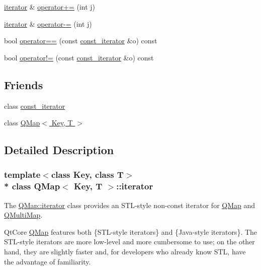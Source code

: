 \begin{DoxyCompactItemize}
\item 
\hyperlink{class_q_map_1_1iterator}{iterator} \& \hyperlink{class_q_map_1_1iterator_a7e809c091ec3533242bcab277fcd1c23}{operator+=} (int j)
\item 
\hyperlink{class_q_map_1_1iterator}{iterator} \& \hyperlink{class_q_map_1_1iterator_abba119aac7555f93740494a1d08de88e}{operator-\/=} (int j)
\item 
bool \hyperlink{class_q_map_1_1iterator_a2a58be489f05e2c1f2b7e1c348b1913d}{operator==} (const \hyperlink{class_q_map_1_1const__iterator}{const\+\_\+iterator} \&o) const 
\item 
bool \hyperlink{class_q_map_1_1iterator_adb5abeeefa73991af41e5d63de0077f5}{operator!=} (const \hyperlink{class_q_map_1_1const__iterator}{const\+\_\+iterator} \&o) const 
\end{DoxyCompactItemize}
\subsection*{Friends}
\begin{DoxyCompactItemize}
\item 
class \hyperlink{class_q_map_1_1iterator_ac220ce1c155db1ac44146c12d178056f}{const\+\_\+iterator}
\item 
class \hyperlink{class_q_map_1_1iterator_a6f07e70412dd8d995969c9e0cb5bc4a0}{Q\+Map$<$ Key, T $>$}
\end{DoxyCompactItemize}


\subsection{Detailed Description}
\subsubsection*{template$<$class Key, class T$>$\\*
class Q\+Map$<$ Key, T $>$\+::iterator}

The \hyperlink{class_q_map_1_1iterator}{Q\+Map\+::iterator} class provides an S\+T\+L-\/style non-\/const iterator for \hyperlink{class_q_map}{Q\+Map} and \hyperlink{class_q_multi_map}{Q\+Multi\+Map}. 

Qt\+Core \hyperlink{class_q_map}{Q\+Map} features both \{S\+T\+L-\/style iterators\} and \{Java-\/style iterators\}. The S\+T\+L-\/style iterators are more low-\/level and more cumbersome to use; on the other hand, they are slightly faster and, for developers who already know S\+TL, have the advantage of familiarity.

